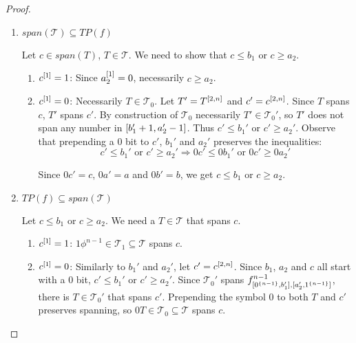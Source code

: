\begin{proof}

\hfill %
\begin{enumerate}
\item{$span(\mathcal{T}) \subseteq TP(f)$}

Let $c \in span(T)$, $T \in \mathcal{T}$.
We need to show that $c \leq b_1$ or $c \geq a_2$.

\begin{enumerate}
\item $c^{[1]} = 1$: Since $a_2^{[1]} = 0$,
necessarily $c \geq a_2$.

\item $c^{[1]} = 0$: Necessarily $T \in \mathcal{T}_0$.
Let $T' = T^{[2, n]}$ and $c' = c^{[2, n]}$.
Since $T$ spans $c$, $T'$ spans $c'$.
By construction of $\mathcal{T}_0$
necessarily $T' \in \mathcal{T}_0'$,
so $T'$ does not span any number
in $[b_1' + 1, a_2' - 1]$.
Thus $c' \leq b_1'$ or $c' \geq a_2'$.
Observe that prepending a $0$ bit
to $c'$, $b_1'$ and $a_2'$
preserves the inequalities:
\[
c' \leq b_1' \text{ or } c' \geq a_2'
\Rightarrow
0 c' \leq 0 b_1' \text{ or } 0 c' \geq 0 a_2'
\]

Since $0 c' = c$, $0 a' = a$ and $0 b' = b$,
we get $c \leq b_1$ or $c \geq a_2$.
\end{enumerate}

\item{$TP(f) \subseteq span(\mathcal{T})$}

Let $c \leq b_1$ or $c \geq a_2$.
We need a $T \in \mathcal{T}$ that spans $c$.

\begin{enumerate}
\item $c^{[1]} = 1$:
$1 \phi^{n-1} \in \mathcal{T}_1 \subseteq \mathcal{T}$
spans $c$.

\item $c^{[1]} = 0$:
Similarly to $b_1'$ and $a_2'$, let $c' = c^{[2, n]}$.
Since $b_1$, $a_2$ and $c$ all start with a $0$ bit,
$c' \leq b_1'$ or $c' \geq a_2'$.
Since $\mathcal{T}_0'$ spans
$f^{n-1}_{[0^{\{n-1\}}, b_1'], [a_2', 1^{\{n-1\}}]}$,
there is $T \in \mathcal{T}_0'$ that spans $c'$.
Prepending the symbol $0$ to both $T$ and $c'$
preserves spanning,
so $0 T \in \mathcal{T}_0 \subseteq \mathcal{T}$ spans $c$.
\end{enumerate}

\end{enumerate}
\end{proof}

